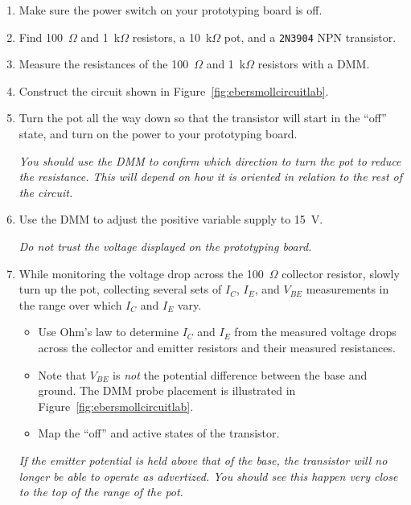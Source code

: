 \documentclass[11pt]{article}
\begin{document}
\begin{enumerate}
\item Make sure the power switch on your prototyping board is off.

\item Find 100~$\Omega$ and 1~k$\Omega$ resistors, a 10~k$\Omega$ pot,
  and a \texttt{2N3904} NPN transistor.

\item Measure the resistances of the 100~$\Omega$ and 1~k$\Omega$
  resistors with a DMM.
  
\item Construct the circuit shown in
  Figure~\ref{fig:ebersmollcircuitlab}. 

\item Turn the pot all the way down so that the transistor will start in the
  ``off'' state, and turn on the power to your prototyping
  board.

  \emph{You should use the DMM to confirm which direction to turn
  the pot to reduce the resistance. This will depend on how it is
  oriented in relation to the rest of the circuit.}

\item Use the DMM to adjust the positive variable supply to 15~V.

  \emph{Do not trust the voltage displayed on the prototyping board.}

\item While monitoring the voltage drop across the 100~$\Omega$
  collector resistor, slowly turn up the pot, collecting several sets
  of $I_C$, $I_E$, and $V_{BE}$ measurements in the range over which
  $I_C$ and $I_E$ vary.
  \begin{itemize}
  \item Use Ohm's law to determine $I_C$ and $I_E$ from the measured
    voltage drops across the collector and emitter resistors and their
    measured resistances.
  \item Note that $V_{BE}$ is \emph{not} the potential difference
    between the base and ground. The DMM probe placement is
    illustrated in Figure~\ref{fig:ebersmollcircuitlab}.
  \item Map the ``off'' and active states of the transistor. 
  \end{itemize}
  \emph{If the emitter potential is held above that of the base, the
    transistor will no longer be able to operate as advertized. You
    should see this happen very close to the top of the range of the
    pot.}


\end{enumerate}
\end{document}
